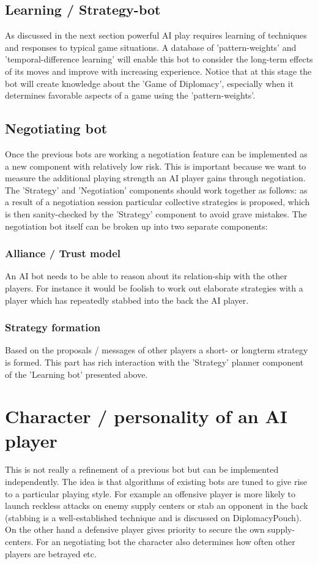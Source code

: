 \documentclass[12pt]{article}
\begin{document}
\begin{itemize}
\subsection{Learning / Strategy-bot}
As discussed in the next section powerful AI play requires learning of
techniques and responses to typical game situations. A database of 
'pattern-weights' and 'temporal-difference learning' will enable this bot to consider the
long-term effects of its moves and improve with increasing experience. Notice
that at this stage the bot will create knowledge about the 'Game of
Diplomacy', especially when it determines favorable aspects of a game using
the 'pattern-weights'.

\subsection{Negotiating bot}
Once the previous bots are working a negotiation feature can be implemented
as a new component with relatively low risk. This is important because we
want to measure the additional playing strength an AI player gains through
negotiation. The 'Strategy' and 'Negotiation' components should work together as
follows:  as a result of a negotiation session particular collective strategies
is proposed, which is then sanity-checked by the 'Strategy' component to avoid grave mistakes. 
The negotiation bot itself can be broken up into two separate components:

\subsubsection{Alliance / Trust model}
An AI bot needs to be able to reason about its relation-ship with the other
players. For instance it would be foolish to work out elaborate strategies
with a player which has repeatedly stabbed into the back the AI player. 

\subsubsection{Strategy formation}
Based on the proposals / messages of other players a short- or longterm
strategy is formed. This part has rich interaction with the 'Strategy'
planner component of the 'Learning bot' presented above.

\section{Character / personality of an AI player}
This is not really a refinement of a previous bot but can be implemented 
independently. The idea is that algorithms of existing bots are tuned to 
give rise to a particular playing style. For example an offensive player
is more likely to launch reckless attacks on enemy supply centers or stab
an opponent in the back (stabbing is a well-established technique and is
discussed on DiplomacyPouch). On the other hand a defensive player gives
priority to secure the own supply-centers. For an negotiating bot the
character also determines how often other players are betrayed etc.


\end{itemize}
\end{document}
